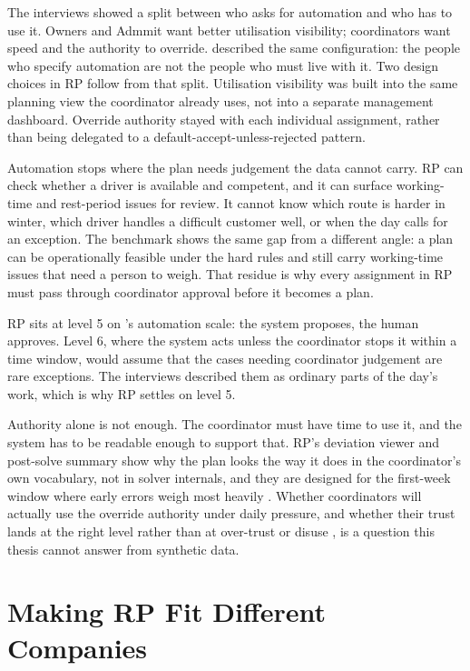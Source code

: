 The interviews showed a split between who asks for automation and who has to use it. Owners and Admmit want better utilisation visibility; coordinators want speed and the authority to override. \textcite{bainbridge1983ironies} described the same configuration: the people who specify automation are not the people who must live with it. Two design choices in RP follow from that split. Utilisation visibility was built into the same planning view the coordinator already uses, not into a separate management dashboard. Override authority stayed with each individual assignment, rather than being delegated to a default-accept-unless-rejected pattern.

Automation stops where the plan needs judgement the data cannot carry. RP can check whether a driver is available and competent, and it can surface working-time and rest-period issues for review. It cannot know which route is harder in winter, which driver handles a difficult customer well, or when the day calls for an exception. The benchmark shows the same gap from a different angle: a plan can be operationally feasible under the hard rules and still carry working-time issues that need a person to weigh. That residue is why every assignment in RP must pass through coordinator approval before it becomes a plan.

RP sits at level 5 on \textcite{parasuraman2000automation}'s automation scale: the system proposes, the human approves. Level 6, where the system acts unless the coordinator stops it within a time window, would assume that the cases needing coordinator judgement are rare exceptions. The interviews described them as ordinary parts of the day's work, which is why RP settles on level 5.

Authority alone is not enough. The coordinator must have time to use it, and the system has to be readable enough to support that. RP's deviation viewer and post-solve summary show why the plan looks the way it does in the coordinator's own vocabulary, not in solver internals, and they are designed for the first-week window where early errors weigh most heavily \parencite{hoff2015trust, miller2019explanation}. Whether coordinators will actually use the override authority under daily pressure, and whether their trust lands at the right level rather than at over-trust or disuse \parencite{lee2004trust}, is a question this thesis cannot answer from synthetic data.


\section{Making RP Fit Different Companies}
\label{sec:adaptability}

